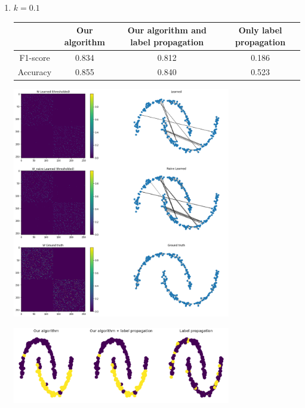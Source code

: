 \documentclass[a4paper]{article}
\begin{document}
\begin{enumerate}
\begin{center}
        \end{center}
        \newpage
    \item $k = 0.1$
        \begin{center}
            \begin{tabular}{|c|c|c|c|}
                \hline
                    & Our algorithm & Our algorithm and label propagation & Only label propagation\\
                \hline
                F1-score & 0.834 & 0.812 & 0.186 \\
                \hline
                Accuracy & 0.855 & 0.840 & 0.523 \\
                \hline
            \end{tabular}
        \end{center}
        \begin{center}
            \includegraphics[width=0.75\textwidth]{images/p2/10_percent_learned_graphs.png}
        \end{center}
        \begin{center}
            \includegraphics[width=0.75\textwidth]{images/p2/10_percent_predicted_labels.png}
        \end{center}
    \newpage


\end{enumerate}
\end{document}
